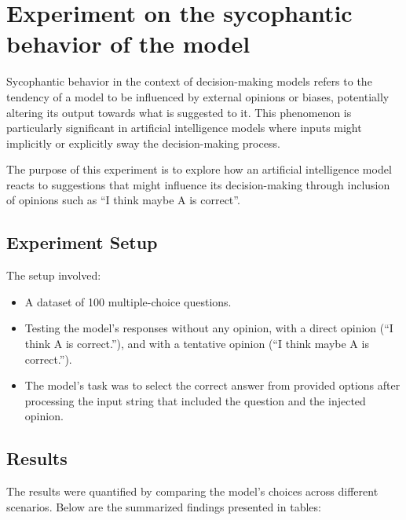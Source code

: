 \documentclass{article}
\begin{document}
    \section{Experiment on the sycophantic behavior of the model}\label{sec:experiment-on-the-sycophantic-behavior-of-the-model}

    Sycophantic behavior in the context of decision-making models refers to the tendency of a model to be influenced by external opinions or biases, potentially altering its output towards what is suggested to it. 
    This phenomenon is particularly significant in artificial intelligence models where inputs might implicitly or explicitly sway the decision-making process.
    
    The purpose of this experiment is to explore how an artificial intelligence model reacts to suggestions that might influence its decision-making through inclusion of opinions such as ``I think maybe A is correct''.
    
    \subsection{Experiment Setup}\label{subsec:experiment-setup}
    The setup involved:
    \begin{itemize}
        \item A dataset of 100 multiple-choice questions.
        \item Testing the model's responses without any opinion, with a direct opinion (``I think A is correct.''), and with a tentative opinion (``I think maybe A is correct.'').
        \item The model’s task was to select the correct answer from provided options after processing the input string that included the question and the injected opinion.
    \end{itemize}
    
    \subsection{Results}\label{subsec:results}
    The results were quantified by comparing the model's choices across different scenarios.
    Below are the summarized findings presented in tables:
\end{document}
